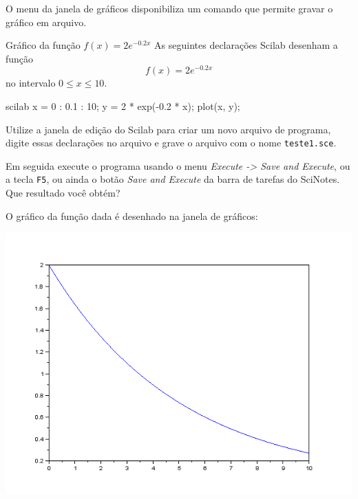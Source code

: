 \documentclass[11pt,fleqn]{practice}
\begin{document}
O menu da janela de gráficos disponibiliza um comando que permite gravar
o gráfico em arquivo.

\begin{task}{Gráfico da função $f(x) = 2e^{-0.2x}$}{}
  As seguintes declarações Scilab desenham a função \[f(x) =
  2e^{-0.2x}\] no intervalo $0 \le x \le 10$.

  \begin{lst}{scilab}
x = 0 : 0.1 : 10;
y = 2 * exp(-0.2 * x);
plot(x, y);
  \end{lst}

  Utilize a janela de edição do Scilab para criar um novo arquivo de
  programa, digite essas declarações no arquivo e grave o arquivo com o
  nome \texttt{teste1.sce}.

  Em seguida execute o programa usando o menu \textit{Execute -> Save
    and Execute}, ou a tecla \texttt{F5}, ou ainda o botão \textit{Save
    and Execute} da barra de tarefas do SciNotes. Que resultado você
  obtém?

  \tcblower
  \solution
  O gráfico da função dada é desenhado na janela de gráficos:
  \begin{center}
    \includegraphics[width=\linewidth]{images/grafico1}
  \end{center}
\end{task}
\end{document}
